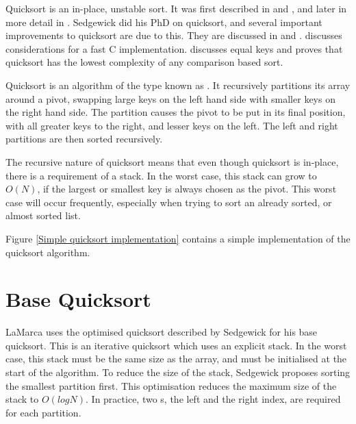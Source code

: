 \label{quick}
Quicksort is an in-place, unstable sort. It was first described in
\cite{HoarePartition61} and \cite{HoareQuicksort61}, and later in more detail in
\cite{Hoare62}. Sedgewick did his PhD on quicksort, and several important
improvements to quicksort are due to this. They are discussed in
\cite{Sedgewick78} and \cite{Sedgewick02}. \cite{BentleyMcIlroy93} discusses
considerations for a fast C implementation. \cite{SedgewickBentley02} discusses
equal keys and proves that quicksort has the lowest complexity of any comparison
based sort.

Quicksort is an algorithm of the type known as . It
recursively partitions its array around a pivot, swapping large keys on
the left hand side with smaller keys on the right hand side. The partition
causes the pivot to be put in its final position, with all greater keys to the
right, and lesser keys on the left. The left and right partitions are then
sorted recursively.

The recursive nature of quicksort means that even though quicksort is in-place,
there is a requirement of a stack. In the worst case, this stack can grow to
$O(N)$, if the largest or smallest key is always chosen as the pivot. This
worst case will occur frequently, especially when trying to sort an already
sorted, or almost sorted list.

Figure \vref{Simple quicksort implementation} contains a simple implementation of
the quicksort algorithm.


\section{Base Quicksort}

LaMarca uses the optimised quicksort described by Sedgewick for his base
quicksort. This is an iterative quicksort which uses an explicit stack. In the
worst case, this stack must be the same size as the array, and must be
initialised at the start of the algorithm. To reduce the size of the stack,
Sedgewick proposes sorting the smallest partition first. This optimisation
reduces the maximum size of the stack to $O(logN)$. In practice, two s,
the left and the right index, are required for each partition.


